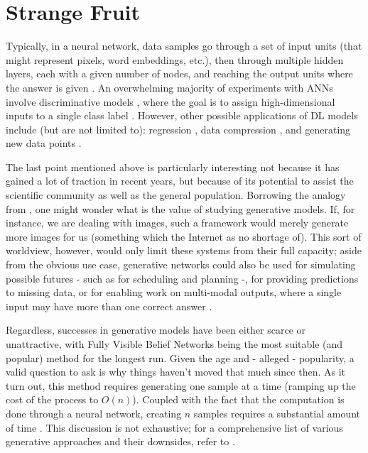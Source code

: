 \documentclass[a4paper]{book}
\begin{document}
\section{Strange Fruit}\label{sec:no_disc}

Typically, in a neural network, data samples go through a set of input units (that might represent pixels, word embeddings, etc.), then through multiple hidden layers, each with a given number of nodes, and reaching the output units where the answer is given \parencite{marcus_deep_2018}. An overwhelming majority of experiments with ANNs involve discriminative models \parencite{goodfellow_generative_2014}, where the goal is to assign high-dimensional inputs to a single class label \parencite[such as an animal or piece of furniture;][]{zhang_character-level_2015, krizhevsky_imagenet_2012}. However, other possible applications of DL models include (but are not limited to): regression \parencite{qiu_ensemble_2014}, data compression \parencite{cheng_deep_2018}, and generating new data points \parencite{graves_generating_2013}.

The last point mentioned above is particularly interesting not because it has gained a lot of traction in recent years, but because of its potential to assist the scientific community as well as the general population. Borrowing the analogy from \textcite{goodfellow_nips_2016}, one might wonder what is the value of studying generative models. If, for instance, we are dealing with images, such a framework would merely generate more images for us (something which the Internet as no shortage of). This sort of worldview, however, would only limit these systems from their full capacity; aside from the obvious use case, generative networks could also be used for simulating possible futures - such as for scheduling and planning \parencite{finn_deep_2016} -, for providing predictions to missing data, or for enabling work on multi-modal outputs, where a single input may have more than one correct answer \parencite{goodfellow_nips_2016}.

Regardless, successes in generative models have been either scarce or unattractive, with Fully Visible Belief Networks \parencite{frey_does_1996} being the most suitable (and popular) method for the longest run. Given the age and - alleged - popularity, a valid question to ask is why things haven't moved that much since then. As it turn out, this method requires generating one sample at a time (ramping up the cost of the process to $O(n)$). Coupled with the fact that the computation is done through a neural network, creating $n$ samples requires a substantial amount of time \parencite{goodfellow_nips_2016}. This discussion is not exhaustive; for a comprehensive list of various generative approaches and their downsides, refer to \textcite{goodfellow_nips_2016}.
\end{document}
